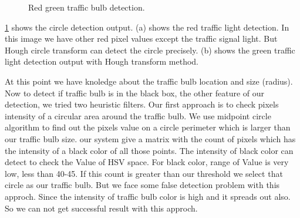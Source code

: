 \begin{figure}[!ht]
\centering
{}

\caption{Red green traffic bulb detection.}
\label{f:cir_img}
\end{figure}

\ref{f:cir_img} shows the circle detection output.
(a) shows the red traffic light detection.
In this image we have other red pixel values except the traffic signal light.
But Hough circle transform can detect the circle precisely.
(b) shows the green traffic light detection output with Hough transform method.

At this point we have knoledge about the traffic bulb location and size (radius).
Now to detect if traffic bulb is in the black box, the other feature of our detection, we tried two heuristic filters.
Our first approach is to check pixels intensity of a circular area around the traffic bulb.
We use midpoint circle algorithm to find out the pixels value on a circle perimeter which is larger than our traffic bulb size.
our system give a matrix with the count of pixels which has the intensity of a black color of all those points.
The intensity of black color can detect to check the Value of HSV space.
For black color, range of Value is very low, less than 40-45.
If this count is greater than our threshold we select that circle as our traffic bulb.
But we face some false detection problem with this approch.
Since the intensity of traffic bulb color is high and it spreads out also.
So we can not get successful result with this approch.


